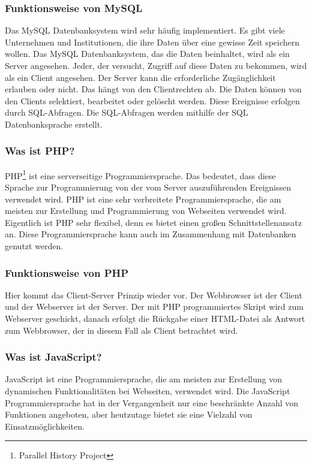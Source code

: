 \subsubsection{Funktionsweise von MySQL} 
Das MySQL Datenbanksystem wird sehr häufig implementiert. Es gibt viele Unternehmen und Institutionen, die ihre Daten über eine gewisse Zeit speichern wollen. Das MySQL Datenbanksystem, das die Daten beinhaltet, wird als ein Server angesehen. Jeder, der versucht, Zugriff auf diese Daten zu bekommen, wird als ein Client angesehen. Der Server kann die erforderliche Zugänglichkeit erlauben oder nicht. Das hängt von den Clientrechten ab. Die Daten können von den Clients selektiert, bearbeitet oder gelöscht werden. Diese Ereignisse erfolgen durch SQL-Abfragen. Die SQL-Abfragen werden mithilfe der SQL Datenbanksprache erstellt. \cite{50_mysql}
\subsubsection{Was ist PHP?} 
PHP\footnote{Parallel History Project} ist eine serverseitige Programmiersprache. Das bedeutet, dass diese Sprache zur Programmierung von der vom Server auszuführenden Ereignissen verwendet wird. 
PHP ist eine sehr verbreitete Programmiersprache, die am meisten zur Erstellung und Programmierung von Webseiten verwendet wird. Eigentlich ist PHP sehr flexibel, denn es bietet einen großen Schnittstellenansatz an.  Diese Programmiersprache kann auch im Zusammenhang mit Datenbanken genutzt werden. \cite{50_php}
\subsubsection{Funktionsweise von PHP} 
Hier kommt das Client-Server Prinzip wieder vor. Der Webbrowser ist der Client und der Webserver ist der Server. Der mit PHP programmiertes Skript wird zum Webserver geschickt, danach erfolgt die Rückgabe einer HTML-Datei als Antwort zum Webbrowser, der in diesem Fall als Client betrachtet wird. \cite{50_php}
\subsubsection{Was ist JavaScript?} 
JavaScript ist eine Programmiersprache, die am meisten zur Erstellung von dynamischen Funktionalitäten bei Webseiten, verwendet wird. Die JavaScript Programmiersprache hat in der Vergangenheit nur eine beschränkte Anzahl von Funktionen angeboten, aber heutzutage bietet sie eine Vielzahl von Einsatzmöglichkeiten. \cite{50_javascript}
